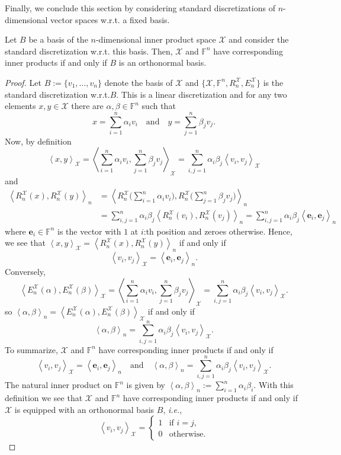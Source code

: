 \documentclass[a4paper]{paper}
\makeatletter
\newcommand{\VecSpace}[1]{\mathscr{#1}}
\newcommand{\Field}{\mathbb{F}}
\newcommand*{\EXT}[2]{\ensuremath{E_{#1}^{#2}}}
\newcommand*{\REST}[2]{\ensuremath{R_{#1}^{#2}}}
\newcommand*{\RnX}{\ensuremath{\REST{n}{\VecSpace{X}}}}
\newcommand*{\EnX}{\ensuremath{\EXT{n}{\VecSpace{X}}}}
\newcommand{\ip}[2]{\left \langle #1,#2 \right\rangle}
\newcommand{\ie}{\textsl{i.e.}\xspace}
\newcommand{\wrt}{{w.r.t.}\@\xspace}
\newcommand{\ve}{\boldsymbol{e}}
\makeatother
\begin{document}
Finally, we conclude this section by considering standard discretizations of $n$-dimensional vector spaces
\wrt a fixed basis. 
\begin{theorem}
  Let $B$ be a basis of the $n$-dimensional inner product space $\VecSpace{X}$ and 
  consider the standard discretization \wrt this basis. 
   Then, $\VecSpace{X}$ and $\Field^{n}$ have corresponding inner products if and only if $B$ is an 
   orthonormal basis.
\end{theorem}
\begin{proof}
Let $B := \{ v_1, \ldots, v_n \}$ denote the basis of $\VecSpace{X}$ and $\{ \VecSpace{X},\Field^{n},\RnX,\EnX\}$ 
is the standard discretization \wrt $B$. This is a linear discretization and for any two elements 
$x,y \in \VecSpace{X}$ there are $\alpha,\beta\in\Field^{n}$ such that 
\[  x = \sum_{i=1}^n \alpha_i v_i \quad\text{and}\quad y = \sum_{j=1}^n \beta_j v_j. \]
Now, by definition
\[ 
   \ip{x}{y}_{\VecSpace{X}} = \ip{\sum_{i=1}^n \alpha_i v_i }{\sum_{j=1}^n \beta_j v_j}_{\VecSpace{X}} 
    =    \sum_{i,j=1}^n \alpha_i\beta_j \ip{v_i}{v_j}_{\VecSpace{X}}
\]
and
\begin{align*}
   \ip{\RnX(x)}{\RnX(y)}_{n} &=
       \ip{\RnX\biggl( \sum_{i=1}^n \alpha_i v_i  \biggr) }
           {\RnX \biggl( \sum_{j=1}^n \beta_j v_j  \biggr)}_{n} \\
  &= \sum_{i,j=1}^n \alpha_i \beta_j \ip{\RnX(v_i)}{\RnX(v_j)}_{n} =
        \sum_{i,j=1}^n \alpha_i \beta_j \ip{\ve_i}{\ve_j}_{n}
\end{align*}
where $\ve_i\in\Field^{n}$ is the vector with $1$ at $i$:th position and zeroes otherwise. 
Hence, we see that $\ip{x}{y}_{\VecSpace{X}} =  \ip{\RnX(x)}{\RnX(y)}_{n}$ if and only if 
\[ \ip{v_i}{v_j}_{\VecSpace{X}}=\ip{\ve_i}{\ve_j}_{n}. \]
Conversely,
\[ \ip{\EnX(\alpha)}{\EnX(\beta)}_{\VecSpace{X}} =
       \ip{  \sum_{i=1}^n \alpha_i v_i }{ \sum_{j=1}^n \beta_j v_j }_{\VecSpace{X}} 
   = \sum_{i,j=1}^n \alpha_i \beta_j \ip{v_i}{v_j}_{\VecSpace{X}}.
\]
so $ \ip{\alpha}{\beta}_{n} = \ip{\EnX(\alpha)}{\EnX(\beta)}_{\VecSpace{X}}$ if and only if 
\[  \ip{\alpha}{\beta}_{n} =  \sum_{i,j=1}^n \alpha_i \beta_j \ip{v_i}{v_j}_{\VecSpace{X}}. \]
To summarize, $\VecSpace{X}$ and $\Field^{n}$ have corresponding inner products if and only if 
\[  \ip{v_i}{v_j}_{\VecSpace{X}}= \ip{\ve_i}{\ve_j}_{n}
    \quad\text{and}\quad
    \ip{\alpha}{\beta}_{n} = \sum_{i,j=1}^n \alpha_i \beta_j \ip{v_i}{v_j}_{\VecSpace{X}}. \]
The natural inner product on $\Field^{n}$ is given by 
$\ip{\alpha}{\beta}_{n} :=\sum_{i=1}^n\alpha_i \beta_i$. With this definition we see that 
$\VecSpace{X}$ and $\Field^{n}$ have corresponding inner products if and only if $\VecSpace{X}$ is equipped with an 
orthonormal basis $B$, \ie, 
\[ \ip{v_i}{v_j}_{\VecSpace{X}} = \begin{cases} 1 & \text{if $i=j$,} \\ 0 & \text{otherwise.} \end{cases} \]
\end{proof}
\end{document}
